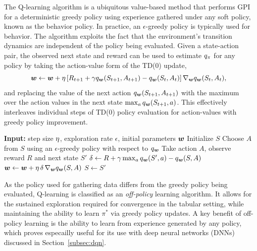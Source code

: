 The Q-learning algorithm  is a ubiquitous value-based method that performs GPI for a deterministic greedy policy using experience gathered under any soft policy, known as the behavior policy. In practice, an $\epsilon$-greedy policy is typically used for behavior. The algorithm 
exploits the fact that the environment's transition dynamics are independent of the policy being evaluated. Given a state-action pair, the observed next state and reward can be used to estimate $q_{\pi}$ for any policy by taking the action-value form of the TD(0) update,
\begin{equation}
    {\bm w} \gets {\bm w} + \eta \left[ R_{t+1} + \gamma q_{\bm w}(S_{t+1}, A_{t+1}) - q_{\bm w}(S_t, A_t) \right] \nabla_{{\bm w}} q_{\bm w}(S_t, A_t),
    \label{eq:td_update_q}
\end{equation}
and replacing the value of the next action $q_{\bm w}(S_{t+1}, A_{t+1})$
with the maximum over the action values in the next state $\max_{a} q_{\bm w}(S_{t+1}, a)$.
This effectively interleaves individual steps of TD(0) policy evaluation for action-values with greedy policy improvement.

\begin{algorithm}[htbp]
\caption{Q-learning}
\label{alg:qlearning}
\begin{algorithmic}[1]
\State \textbf{Input:} step size $\eta$, exploration rate $\epsilon$, initial parameters ${\bm w}$
    \State Initialize $S$
        \State Choose $A$ from $S$ using an $\epsilon$-greedy policy with respect to $q_{\bm w}$
        \State Take action $A$, observe reward $R$ and next state $S'$
        \State $\delta \gets R + \gamma \max_{a} q_{\bm w}(S', a) - q_{\bm w}(S, A)$ 
        \State ${\bm w} \gets {\bm w} + \eta\, \delta\, \nabla_{{\bm w}} q_{\bm w}(S, A)$
        \State $S \gets S'$
    \EndWhile
\EndFor
\end{algorithmic}
\end{algorithm}

As the policy used for gathering data differs from the greedy policy being evaluated, Q-learning is classified as an \textit{off-policy} learning algorithm. It allows for the sustained exploration required for convergence in the tabular setting, while maintaining the ability to learn $\pi^*$ via greedy policy updates. A key benefit of off-policy learning is the ability to learn from experience generated by any policy, which proves especailly useful for its use with deep neural networks (DNNs) discussed in Section~\ref{subsec:dqn}. 

